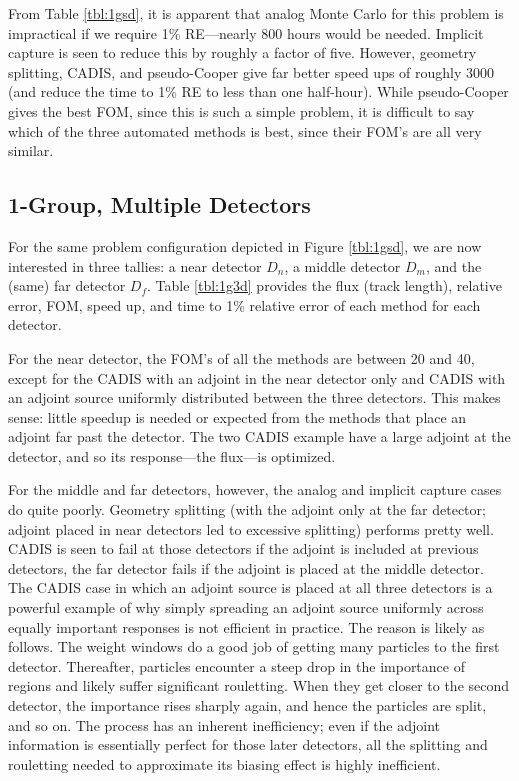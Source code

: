 From Table \ref{tbl:1gsd}, it is apparent that analog Monte Carlo for this
problem is impractical if we require 1\% RE---nearly 800 hours would be needed. 
Implicit capture is seen to reduce this by roughly a factor of five.  However,
geometry splitting, CADIS, and pseudo-Cooper give far better speed ups of
roughly 3000 (and reduce the time to 1\% RE to less than one half-hour).  While
pseudo-Cooper gives the best FOM, since this is such a simple problem, it is
difficult to say which of the three automated methods is best, since their FOM's
are all very similar.


\subsection{1-Group, Multiple Detectors}

For the same problem configuration depicted in Figure \ref{tbl:1gsd}, we are now
interested in three tallies: a near detector $D_n$, a middle detector $D_m$, and
the (same) far detector $D_f$.  Table \ref{tbl:1g3d} provides the flux (track
length), relative error, FOM, speed up, and time to 1\% relative error of each
method for each detector.

For the near detector, the FOM's of all the methods are between 20 and 40,
except for the CADIS with an adjoint in the near detector only and CADIS with an
adjoint source uniformly distributed between the three detectors.  This makes
sense: little speedup is needed or expected from the methods that place an
adjoint far past the detector.  The two CADIS example have a large adjoint at
the detector, and so its response---the flux---is optimized.

For the middle and far detectors, however, the analog and implicit capture cases
do quite poorly.   Geometry splitting (with the adjoint only at the far
detector; adjoint placed in near detectors led to excessive splitting) performs
pretty well.  CADIS is seen to fail at those detectors if the adjoint is
included at previous detectors, \eg the far detector fails if the adjoint is
placed at the middle detector.  The CADIS case in which an adjoint source is
placed at all three detectors is a powerful example of why simply spreading an
adjoint source uniformly across equally important responses is not efficient in
practice.  The reason is likely as follows.  The weight windows do a good job of
getting many particles to the first detector.  Thereafter, particles encounter a
steep drop in the importance of regions and likely suffer significant
rouletting.  When they get closer to the second detector, the importance rises
sharply again, and hence the particles are split, and so on.  The process has an
inherent inefficiency; even if the adjoint information is essentially perfect
for those later detectors, all the splitting and rouletting needed to
approximate its biasing effect is highly inefficient.  

